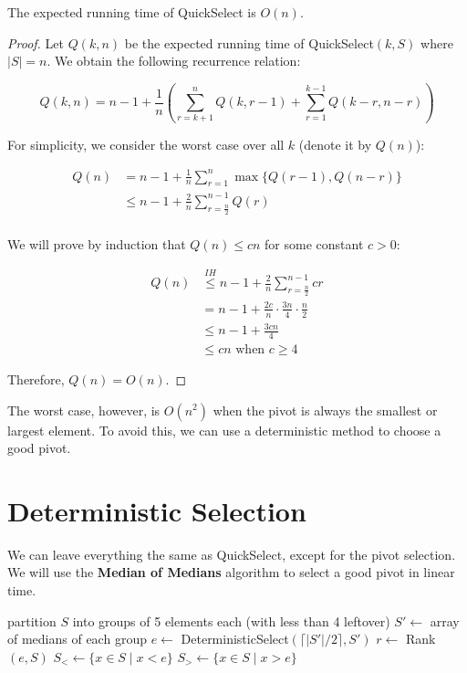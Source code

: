 \begin{theorem}
  The expected running time of QuickSelect is $O(n)$.
\end{theorem}
\begin{proof}
  Let $Q(k,n)$ be the expected running time of QuickSelect$(k,S)$ where $|S|=n$. We obtain the following recurrence relation:

  \[
    Q(k,n) = n-1 + \frac{1}{n} \left( \sum_{r = k+1}^{n}Q(k,r-1) + \sum_{r=1}^{k-1} Q(k-r,n-r) \right)
  \]

  For simplicity, we consider the worst case over all $k$ (denote it by $Q(n)$):

  \begin{align*}
    Q(n) &= n-1 + \frac{1}{n} \sum_{r=1}^{n} \max\{Q(r-1), Q(n-r)\}\\
      &\leq n-1 + \frac{2}{n} \sum_{r = \frac{n}{2}}^{n-1} Q(r) \\
  \end{align*}

  We will prove by induction that $Q(n) \leq c n$ for some constant $c > 0$:

  \begin{align*}
    Q(n) &\overset{IH}{\leq} n-1 + \frac{2}{n} \sum_{r = \frac{n}{2}}^{n-1} c r \\
         &= n-1 + \frac{2c}{n}\cdot\frac{3n}{4}\cdot \frac{n}{2}\\
         &\leq n-1 + \frac{3cn}{4} \\
         &\leq cn \text{ when } c \geq 4
  \end{align*}

  Therefore, $Q(n) = O(n)$.
\end{proof}

The worst case, however, is $O(n^2)$ when the pivot is always the smallest or largest element. To avoid this, we can use a deterministic method to choose a good pivot.

\section{Deterministic Selection}

We can leave everything the same as QuickSelect, except for the pivot selection. We will use the \textbf{Median of Medians} algorithm to select a good pivot in linear time.

\begin{algorithm}[H]
  \caption{DeterministicSelect$(k,S)$}
  partition $S$ into groups of 5 elements each (with less than 4 leftover)\;
  $S'\gets$ array of medians of each group\;
  $e \gets$ DeterministicSelect$(\lceil |S'|/2 \rceil, S')$\;
 $r \gets$ Rank$(e,S)$\;
  $S_<\gets \{x \in S \mid x < e\}$\;
  $S_>\gets \{x \in S \mid x > e\}$\;
\end{algorithm}

